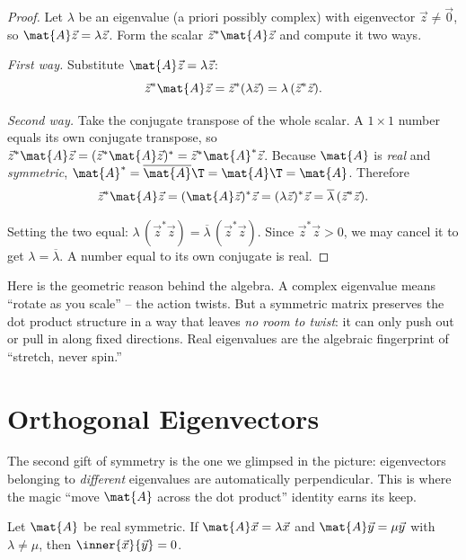 \begin{proof}
Let $\lambda$ be an eigenvalue (a priori possibly complex) with eigenvector
$\vec{z}\neq\vec{0}$, so $\mat{A}\vec{z} = \lambda\vec{z}$. Form the scalar
$\vec{z}^{*}\mat{A}\vec{z}$ and compute it two ways.

\emph{First way.} Substitute $\mat{A}\vec{z}=\lambda\vec{z}$:
\[
  \vec{z}^{*}\mat{A}\vec{z} = \vec{z}^{*}(\lambda\vec{z}) = \lambda\,(\vec{z}^{*}\vec{z}).
\]

\emph{Second way.} Take the conjugate transpose of the whole scalar. A
$1\times 1$ number equals its own conjugate transpose, so
$\vec{z}^{*}\mat{A}\vec{z} = (\vec{z}^{*}\mat{A}\vec{z})^{*}
= \vec{z}^{*}\mat{A}^{*}\vec{z}$. Because $\mat{A}$ is \emph{real} and
\emph{symmetric}, $\mat{A}^{*} = \overline{\mat{A}}\T = \mat{A}\T = \mat{A}$.
Therefore
\[
  \vec{z}^{*}\mat{A}\vec{z}
  = (\mat{A}\vec{z})^{*}\vec{z}
  = (\lambda\vec{z})^{*}\vec{z}
  = \overline{\lambda}\,(\vec{z}^{*}\vec{z}).
\]

Setting the two equal: $\lambda\,(\vec{z}^{*}\vec{z}) = \overline{\lambda}\,(\vec{z}^{*}\vec{z})$.
Since $\vec{z}^{*}\vec{z} > 0$, we may cancel it to get $\lambda = \overline{\lambda}$.
A number equal to its own conjugate is real.
\end{proof}

\begin{intuitionbox}
Here is the geometric reason behind the algebra. A complex eigenvalue means
``rotate as you scale'' -- the action twists. But a symmetric matrix preserves the
dot product structure in a way that leaves \emph{no room to twist}: it can only
push out or pull in along fixed directions. Real eigenvalues are the algebraic
fingerprint of ``stretch, never spin.''
\end{intuitionbox}

\section{Orthogonal Eigenvectors}
\label{ch26:orthogonal-eigenvectors}

The second gift of symmetry is the one we glimpsed in the picture:
eigenvectors belonging to \emph{different} eigenvalues are automatically
perpendicular. This is where the magic ``move $\mat{A}$ across the dot product''
identity earns its keep.

\begin{theorem}
\label{ch26:thm-orthogonal}
Let $\mat{A}$ be real symmetric. If $\mat{A}\vec{x}=\lambda\vec{x}$ and
$\mat{A}\vec{y}=\mu\vec{y}$ with $\lambda\neq\mu$, then $\inner{\vec{x}}{\vec{y}}=0$.
\end{theorem}

